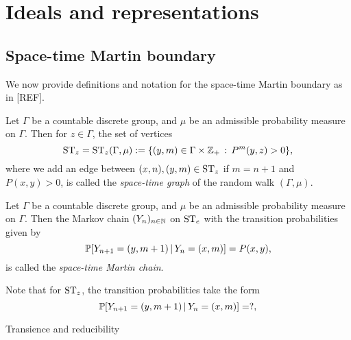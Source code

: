 \documentclass[12pt, class = article, crop = false, a4paper, twoside]{standalone}
\begin{document}
\section{Ideals and representations}
\label{sec:definitions}

\subsection{Space-time Martin boundary}

We now provide definitions and notation for the space-time Martin boundary as in [REF].

\begin{definition}

    Let $\Gamma$ be a countable discrete group, and $\mu$ be an admissible probability measure on $\Gamma$. Then for $z\in\Gamma$, the set of vertices 
    \begin{equation*}
        \ST_{z} = \ST_{z}(\Gamma, \mu) := \{(y, m)\in\Gamma\times\Z_{+} \,:\, P^{m}(y, z) > 0\},
    \end{equation*}
    where we add an edge between $(x, n), (y, m)\in\ST_{z}$ if $m = n + 1$ and $P(x, y) > 0$,
    is called the \textit{space-time graph} of the random walk $(\Gamma, \mu)$.
\end{definition}

\begin{definition}
\label{def:chain:space-time}

    Let $\Gamma$ be a countable discrete group, and $\mu$ be an admissible probability measure on $\Gamma$. Then the Markov chain $(Y_{n})_{n\in\N}$ on $\ST_{e}$ with the transition probabilities given by
    \begin{equation*}
        \P[Y_{n + 1} = (y, m + 1) \,|\, Y_{n} = (x, m) ] = P(x, y),
    \end{equation*}
    is called the \textit{space-time Martin chain}.
\end{definition}

\begin{remark}
    Note that for $\ST_{z}$, the transition probabilities take the form
    \begin{equation*}
        \P[Y_{n + 1} = (y, m + 1) \,|\, Y_{n} = (x, m) ] = ?,
    \end{equation*}
\end{remark}

\begin{remark}
    Transience and reducibility
\end{remark}
\end{document}
